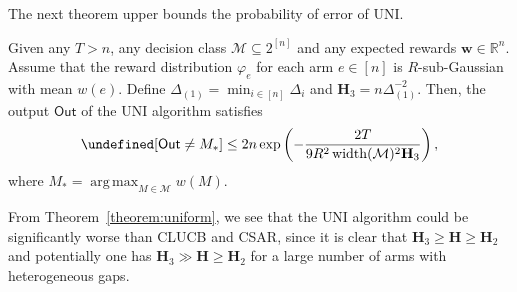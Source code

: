 \documentclass{article}
\newcommand{\Algorithm}{{\small \textsf{CLUCB}}\xspace}
\newcommand{\AlgorithmBud}{{\small \textsf{CSAR}}\xspace}
\newcommand{\Uniform}{{\small \textsf{UNI}}\xspace}
\newcommand{\Rew}{\varphi}
\newcommand{\M}{\mathcal M}
\newcommand{\RR}{\mathbb R}
\DeclareMathOperator{\rank}{width}
\DeclareMathOperator*{\argmax}{arg\,max}
\newcommand{\out}{\mathsf{Out}}
\let\Pr\undefined
\DeclareMathOperator{\Pr}{Pr}
\renewcommand{\vec}[1]{\boldsymbol{#1}}
\begin{document}
The next theorem upper bounds the probability of error of \Uniform.
\begin{theorem}
Given any $T>n$, any decision class $\M \subseteq 2^{[n]}$ and any expected rewards $\vec w \in \RR^{n}$.
Assume that the reward distribution $\Rew_e$ for each arm $e\in [n]$ is  $R$-sub-Gaussian with mean $w(e)$.
Define $\Delta_{(1)}=\min_{i\in[n]}\Delta_i$ and $\mathbf H_3 = n\Delta_{(1)}^{-2}$.
Then, the output $\out$ of the \Uniform algorithm satisfies
\begin{equation}
\label{eq:uniform}
\Pr[\out\not=M_*] \le 2n\exp\left(- \frac{2T}{9R^2\rank(\M)^2 \mathbf H_{3}}\right),
\end{equation}
where $M_* = \argmax_{M\in \M} w(M)$.
\label{theorem:uniform}
\end{theorem}
 
From Theorem~\ref{theorem:uniform}, we see that the \Uniform algorithm could be significantly worse than \Algorithm and \AlgorithmBud,  since it is clear that $\mathbf H_3 \ge \mathbf H \ge \mathbf H_2$ and potentially one has $\mathbf H_3 \gg \mathbf H \ge \mathbf H_2$ for a large number of arms with heterogeneous gaps.
\end{document}
